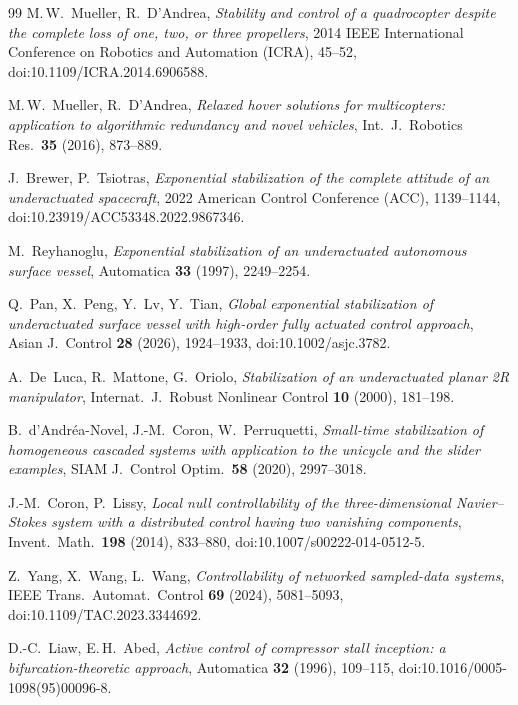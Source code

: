 \documentclass[11pt,reqno]{amsart}
\theoremstyle{plain}
\theoremstyle{definition}
\theoremstyle{remark}
\begin{document}
\begin{thebibliography}{99}
 M.\,W.~Mueller, R.~D'Andrea,
  \emph{Stability and control of a quadrocopter despite the complete loss of one, two, or three
  propellers}, 2014 IEEE International Conference on Robotics and Automation (ICRA), 45--52,
  doi:10.1109/ICRA.2014.6906588.

 M.\,W.~Mueller, R.~D'Andrea,
  \emph{Relaxed hover solutions for multicopters: application to algorithmic redundancy and novel
  vehicles}, Int.\ J.\ Robotics Res.\ \textbf{35} (2016), 873--889.

 J.~Brewer, P.~Tsiotras,
  \emph{Exponential stabilization of the complete attitude of an underactuated spacecraft},
  2022 American Control Conference (ACC), 1139--1144, doi:10.23919/ACC53348.2022.9867346.

 M.~Reyhanoglu,
  \emph{Exponential stabilization of an underactuated autonomous surface vessel},
  Automatica \textbf{33} (1997), 2249--2254.

 Q.~Pan, X.~Peng, Y.~Lv, Y.~Tian,
  \emph{Global exponential stabilization of underactuated surface vessel with high-order fully actuated
  control approach}, Asian J.\ Control \textbf{28} (2026), 1924--1933, doi:10.1002/asjc.3782.

 A.~De~Luca, R.~Mattone, G.~Oriolo,
  \emph{Stabilization of an underactuated planar 2R manipulator},
  Internat.\ J.\ Robust Nonlinear Control \textbf{10} (2000), 181--198.

 B.~d'Andr\'ea-Novel, J.-M.~Coron, W.~Perruquetti,
  \emph{Small-time stabilization of homogeneous cascaded systems with application to the unicycle
  and the slider examples}, SIAM J.\ Control Optim.\ \textbf{58} (2020), 2997--3018.

 J.-M.~Coron, P.~Lissy,
  \emph{Local null controllability of the three-dimensional Navier--Stokes system with a distributed control
  having two vanishing components}, Invent.\ Math.\ \textbf{198} (2014), 833--880, doi:10.1007/s00222-014-0512-5.

 Z.~Yang, X.~Wang, L.~Wang,
  \emph{Controllability of networked sampled-data systems}, IEEE Trans.\ Automat.\ Control \textbf{69} (2024),
  5081--5093, doi:10.1109/TAC.2023.3344692.

 D.-C.~Liaw, E.\,H.~Abed,
  \emph{Active control of compressor stall inception: a bifurcation-theoretic approach}, Automatica \textbf{32}
  (1996), 109--115, doi:10.1016/0005-1098(95)00096-8.


\end{thebibliography}
\end{document}
